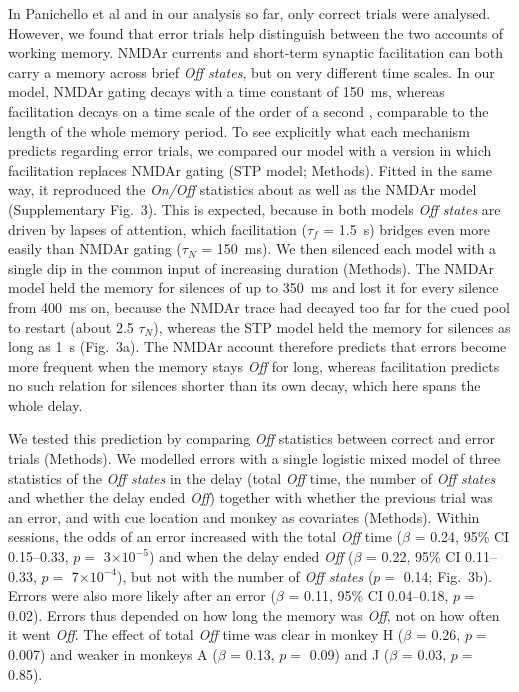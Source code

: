 \documentclass[11pt]{article}
\begin{document}
In Panichello et al and in our analysis so far, only correct trials were analysed. However, we found that error trials help distinguish between the two accounts of working memory. NMDAr currents and short-term synaptic facilitation can both carry a memory across brief \emph{Off states}, but on very different time scales. In our model, NMDAr gating decays with a time constant of 150~ms, whereas facilitation decays on a time scale of the order of a second \citep{wangy2006,mongillo2008}, comparable to the length of the whole memory period. To see explicitly what each mechanism predicts regarding error trials, we compared our model with a version in which facilitation replaces NMDAr gating (STP model; Methods). Fitted in the same way, it reproduced the \emph{On/Off} statistics about as well as the NMDAr model (Supplementary Fig.~3). This is expected, because in both models \emph{Off states} are driven by lapses of attention, which facilitation ($\tau_f$ = 1.5~s) bridges even more easily than NMDAr gating ($\tau_N$ = 150~ms). We then silenced each model with a single dip in the common input of increasing duration (Methods). The NMDAr model held the memory for silences of up to 350~ms and lost it for every silence from 400~ms on, because the NMDAr trace had decayed too far for the cued pool to restart (about 2.5 $\tau_N$), whereas the STP model held the memory for silences as long as 1~s (Fig.~3a). The NMDAr account therefore predicts that errors become more frequent when the memory stays \emph{Off} for long, whereas facilitation predicts no such relation for silences shorter than its own decay, which here spans the whole delay.

We tested this prediction by comparing \emph{Off} statistics between correct and error trials (Methods). We modelled errors with a single logistic mixed model of three statistics of the \emph{Off states} in the delay (total \emph{Off} time, the number of \emph{Off states} and whether the delay ended \emph{Off}) together with whether the previous trial was an error, and with cue location and monkey as covariates (Methods). Within sessions, the odds of an error increased with the total \emph{Off} time ($\beta$ = 0.24, 95\% CI 0.15--0.33, $p =$ 3$\times10^{-5}$) and when the delay ended \emph{Off} ($\beta$ = 0.22, 95\% CI 0.11--0.33, $p =$ 7$\times10^{-4}$), but not with the number of \emph{Off states} ($p =$ 0.14; Fig.~3b). Errors were also more likely after an error ($\beta$ = 0.11, 95\% CI 0.04--0.18, $p =$ 0.02). Errors thus depended on how long the memory was \emph{Off}, not on how often it went \emph{Off}. The effect of total \emph{Off} time was clear in monkey H ($\beta$ = 0.26, $p =$ 0.007) and weaker in monkeys A ($\beta$ = 0.13, $p =$ 0.09) and J ($\beta$ = 0.03, $p =$ 0.85).
\end{document}
